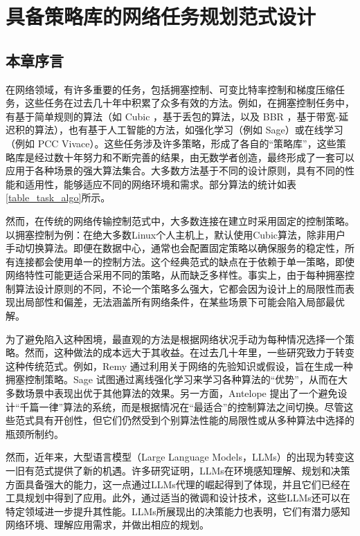 
\chapter{具备策略库的网络任务规划范式设计}
\section{本章序言}
在网络领域，有许多重要的任务，包括拥塞控制、可变比特率控制和梯度压缩任务，这些任务在过去几十年中积累了众多有效的方法。例如，在拥塞控制任务中，有基于简单规则的算法（如 Cubic \cite{ha2008cubic}，基于丢包的算法，以及 BBR \cite{cardwell2016bbr}，基于带宽-延迟积的算法），也有基于人工智能的方法，如强化学习（例如 Sage\cite{yen2023computers}）或在线学习（例如 PCC Vivace\cite{dong2018pcc}）。这些任务涉及许多策略，形成了各自的“策略库”，这些策略库是经过数十年努力和不断完善的结果，由无数学者创造，最终形成了一套可以应用于各种场景的强大算法集合。大多数方法基于不同的设计原则，具有不同的性能和适用性，能够适应不同的网络环境和需求。部分算法的统计如表\ref{table_task_algo}所示。

然而，在传统的网络传输控制范式中，大多数连接在建立时采用固定的控制策略。以拥塞控制为例：在绝大多数Linux个人主机上，默认使用Cubic算法，除非用户手动切换算法。即便在数据中心，通常也会配置固定策略以确保服务的稳定性，所有连接都会使用单一的控制方法。这个经典范式的缺点在于依赖于单一策略，即使网络特性可能更适合采用不同的策略，从而缺乏多样性。事实上，由于每种拥塞控制算法设计原则的不同，不论一个策略多么强大，它都会因为设计上的局限性而表现出局部性和偏差，无法涵盖所有网络条件，在某些场景下可能会陷入局部最优解。

为了避免陷入这种困境，最直观的方法是根据网络状况手动为每种情况选择一个策略。然而，这种做法的成本远大于其收益。在过去几十年里，一些研究致力于转变这种传统范式。例如，Remy \cite{winstein2013tcp} 通过利用关于网络的先验知识或假设，旨在生成一种拥塞控制策略。Sage \cite{yen2023computers} 试图通过离线强化学习来学习各种算法的“优势”，从而在大多数场景中表现出优于其他算法的效果。另一方面，Antelope \cite{zhou2022machine} 提出了一个避免设计“千篇一律”算法的系统，而是根据情况在“最适合”的控制算法之间切换。尽管这些范式具有开创性，但它们仍然受到个别算法性能的局限性或从多种算法中选择的瓶颈所制约。

然而，近年来，大型语言模型（Large Language Models，LLMs）的出现为转变这一旧有范式提供了新的机遇。许多研究证明，LLMs在环境感知理解、规划和决策方面具备强大的能力，这一点通过LLMs代理的崛起得到了体现，并且它们已经在工具规划中得到了应用。此外，通过适当的微调和设计技术，这些LLMs还可以在特定领域进一步提升其性能。LLMs所展现出的决策能力也表明，它们有潜力感知网络环境、理解应用需求，并做出相应的规划。

